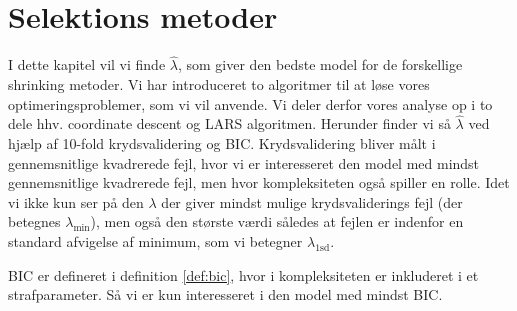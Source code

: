 \section{Selektions metoder}
I dette kapitel vil vi finde $\widehat\lambda$, som giver den bedste model for de forskellige shrinking metoder. 
Vi har introduceret to algoritmer til at løse vores optimeringsproblemer, som vi vil anvende.
Vi deler derfor vores analyse op i to dele  hhv. coordinate descent og LARS algoritmen.
Herunder finder vi så  $\widehat\lambda$ ved hjælp af 10-fold krydsvalidering og BIC. 
Krydsvalidering bliver målt  i gennemsnitlige kvadrerede fejl, hvor vi er interesseret den model med mindst gennemsnitlige kvadrerede fejl, men hvor kompleksiteten også spiller en rolle.
Idet vi ikke kun ser på den $\lambda$ der giver mindst mulige krydsvaliderings fejl (der betegnes $\lambda_{\min}$), men også den største værdi således at fejlen er indenfor en standard afvigelse af minimum, som vi betegner $\lambda_{\text{1sd}}$.  

BIC er defineret i definition \ref{def:bic}, hvor i kompleksiteten er inkluderet i et strafparameter. Så vi er kun interesseret i den model med mindst BIC. 





